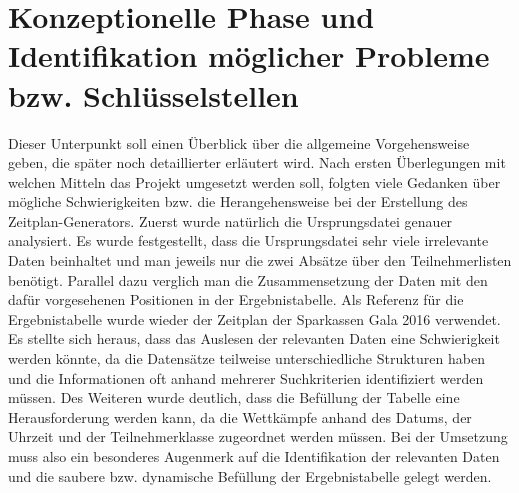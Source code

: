 {\section{Konzeptionelle Phase und Identifikation möglicher Probleme bzw. Schlüsselstellen
}
Dieser Unterpunkt soll einen Überblick über die allgemeine Vorgehensweise geben, die später noch detaillierter erläutert wird. Nach ersten Überlegungen mit welchen Mitteln das Projekt umgesetzt werden soll, folgten viele Gedanken über mögliche Schwierigkeiten bzw. die Herangehensweise bei der Erstellung des Zeitplan-Generators. Zuerst wurde natürlich die Ursprungsdatei genauer analysiert. Es wurde festgestellt, dass die Ursprungsdatei sehr viele irrelevante Daten beinhaltet und man jeweils nur die zwei Absätze über den Teilnehmerlisten benötigt. Parallel dazu verglich man die Zusammensetzung der Daten mit den dafür vorgesehenen Positionen in der Ergebnistabelle. Als Referenz für die Ergebnistabelle wurde wieder der Zeitplan der Sparkassen Gala 2016 verwendet. Es stellte sich heraus, dass das Auslesen der relevanten Daten eine Schwierigkeit werden könnte, da die Datensätze teilweise unterschiedliche Strukturen haben und die Informationen oft anhand mehrerer Suchkriterien identifiziert werden müssen. Des Weiteren wurde deutlich, dass die Befüllung der Tabelle eine Herausforderung werden kann, da die Wettkämpfe anhand des Datums, der Uhrzeit und der Teilnehmerklasse zugeordnet werden müssen. Bei der Umsetzung muss also ein besonderes Augenmerk auf die Identifikation der relevanten Daten und die saubere bzw. dynamische Befüllung der Ergebnistabelle gelegt werden. 

}
